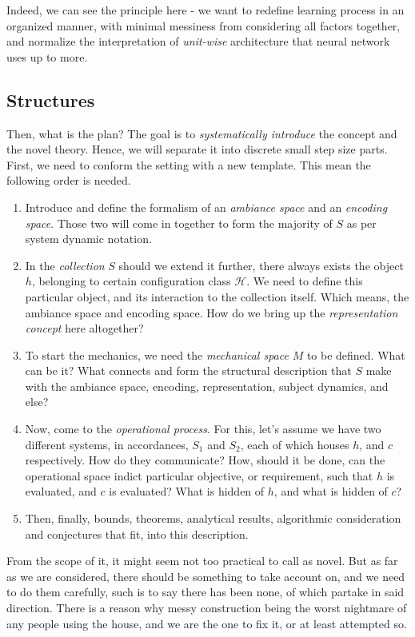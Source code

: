 Indeed, we can see the principle here - we want to redefine learning process in an organized manner, with minimal messiness from considering all factors together, and normalize the interpretation of \textit{unit-wise} architecture that neural network uses up to more. 

\subsection{Structures}

Then, what is the plan? The goal is to \textit{systematically introduce} the concept and the novel theory. Hence, we will separate it into discrete small step size parts. First, we need to conform the setting with a new template. This mean the following order is needed. 
\begin{enumerate}[leftmargin=1cm,itemsep=2pt,topsep=2pt]
  \item Introduce and define the formalism of an \textit{ambiance space} and an \textit{encoding space}. Those two will come in together to form the majority of $S$ as per system dynamic notation. 
  \item In the \textit{collection} $S$ should we extend it further, there always exists the object $h$, belonging to certain configuration class $\mathcal{H}$. We need to define this particular object, and its interaction to the collection itself. Which means, the ambiance space and encoding space. How do we bring up the \textit{representation concept} here altogether? 
  \item To start the mechanics, we need the \textit{mechanical space} $M$ to be defined. What can be it? What connects and form the structural description that $S$ make with the ambiance space, encoding, representation, subject dynamics, and else? 
  \item Now, come to the \textit{operational process}. For this, let's assume we have two different systems, in accordances, $S_{1}$ and $S_{2}$, each of which houses $h$, and $c$ respectively. How do they communicate? How, should it be done, can the operational space indict particular objective, or requirement, such that $h$ is evaluated, and $c$ is evaluated? What is hidden of $h$, and what is hidden of $c$? 
  \item Then, finally, bounds, theorems, analytical results, algorithmic consideration and conjectures that fit, into this description. 
\end{enumerate}
From the scope of it, it might seem not too practical to call as novel. But as far as we are considered, there should be something to take account on, and we need to do them carefully, such is to say there has been none, of which partake in said direction. There is a reason why messy construction being the worst nightmare of any people using the house, and we are the one to fix it, or at least attempted so. 

